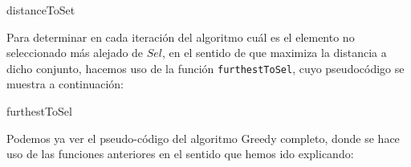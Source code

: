 \documentclass[10pt,a4paper]{article}
\begin{document}
		\begin{algorithm}[H]
		\caption{\sc distanceToSet}
		\end{algorithm}
	 
	 Para determinar en cada iteración del algoritmo cuál es el elemento no seleccionado más alejado de $Sel$, en el sentido de que maximiza la distancia a dicho conjunto, hacemos uso de la función \lstinline|furthestToSel|, cuyo pseudocódigo se muestra a continuación:
 
\begin{algorithm}[H]
	\caption{\sc furthestToSel}
\end{algorithm}

	Podemos ya ver el pseudo-código del algoritmo Greedy completo, donde se hace uso de las funciones anteriores en el sentido que hemos ido explicando:
	
\end{document}
